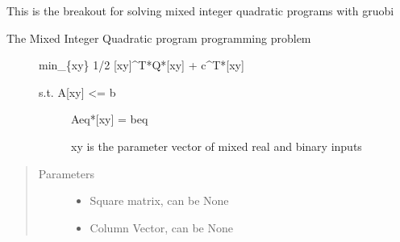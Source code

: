 \documentclass[letterpaper,10pt,english]{sphinxmanual}
\begin{document}
\begin{fulllineitems}
\label{\detokenize{mpo.solver_interface:mpo.solver_interface.gurobi_solver_interface.solve_qp_gurobi}}
\sphinxAtStartPar
This is the breakout for solving mixed integer quadratic programs with gruobi
\begin{description}
\item[{The Mixed Integer Quadratic program programming problem}] \leavevmode
\sphinxAtStartPar
min\_\{xy\} 1/2 {[}xy{]}\textasciicircum{}T*Q*{[}xy{]} + c\textasciicircum{}T*{[}xy{]}
\begin{description}
\item[{s.t.   A{[}xy{]} \textless{}= b}] \leavevmode
\sphinxAtStartPar
Aeq*{[}xy{]} = beq

\sphinxAtStartPar
xy is the parameter vector of mixed real and binary inputs

\end{description}

\end{description}
\begin{quote}\begin{description}
\item[{Parameters}] \leavevmode\begin{itemize}
\item {} 
\sphinxAtStartPar
{} \textendash{} Square matrix, can be None

\item {} 
\sphinxAtStartPar
{} \textendash{} Column Vector, can be None


\end{itemize}
\end{description}
\end{quote}
\end{fulllineitems}
\end{document}
